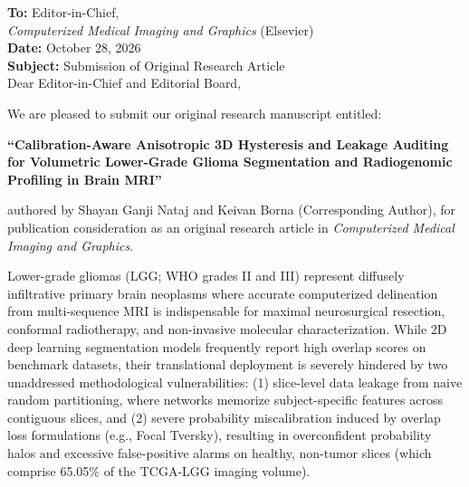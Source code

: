 \documentclass[11pt]{article}
\begin{document}
\thispagestyle{empty}

\noindent
\textbf{To:} Editor-in-Chief,\\
\textit{Computerized Medical Imaging and Graphics} (Elsevier)\\

\vspace{0.6em}
\noindent
\textbf{Date:} October 28, 2026\\
\textbf{Subject:} Submission of Original Research Article\\

\vspace{0.8em}
\noindent
Dear Editor-in-Chief and Editorial Board,

\vspace{0.6em}
We are pleased to submit our original research manuscript entitled:

\begin{center}
\textbf{``Calibration-Aware Anisotropic 3D Hysteresis and Leakage Auditing for Volumetric Lower-Grade Glioma Segmentation and Radiogenomic Profiling in Brain MRI''}
\end{center}

\noindent
authored by Shayan Ganji Nataj and Keivan Borna (Corresponding Author), for publication consideration as an original research article in \textit{Computerized Medical Imaging and Graphics}.

\vspace{0.6em}
Lower-grade gliomas (LGG; WHO grades II and III) represent diffusely infiltrative primary brain neoplasms where accurate computerized delineation from multi-sequence MRI is indispensable for maximal neurosurgical resection, conformal radiotherapy, and non-invasive molecular characterization. While 2D deep learning segmentation models frequently report high overlap scores on benchmark datasets, their translational deployment is severely hindered by two unaddressed methodological vulnerabilities: (1) slice-level data leakage from naive random partitioning, where networks memorize subject-specific features across contiguous slices, and (2) severe probability miscalibration induced by overlap loss formulations (e.g., Focal Tversky), resulting in overconfident probability halos and excessive false-positive alarms on healthy, non-tumor slices (which comprise 65.05\% of the TCGA-LGG imaging volume).
\end{document}

